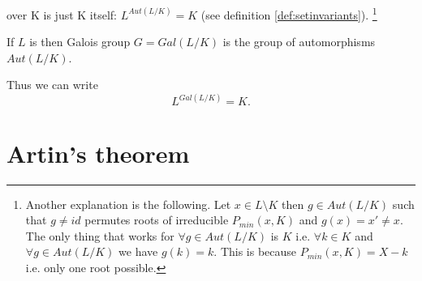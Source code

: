 \begin{remark}
\begin{enumerate}
    over K is just K itself: 
    $L^{Aut\left(L/K\right)} = K$
    (see definition \ref{def:setinvariants}).
    \footnote{
      Another explanation is the following. Let $x \in L \setminus K$
      then $g \in Aut\left(L/K\right)$ such that $g \ne id$ permutes
      roots of irreducible $P_{min}\left(x, K\right)$ and $g(x) = x'
      \ne x$. The only thing that works for 
      $\forall g \in Aut\left(L/K\right)$ is $K$ i.e.
      $\forall k \in K$ and $\forall g \in Aut\left(L/K\right)$ we
      have $g(k) = k$. This is because $P_{min}\left(x, K\right) = X
      - k$ i.e. only one root possible.
    }
  \end{enumerate}
\end{remark}

\begin{definition}
  If $L$ is  then Galois group $G =
  Gal\left(L/K\right)$ is the group of automorphisms $Aut\left(L/K\right)$. 
  \label{def:galoisgroup}
\end{definition}

Thus we can write
\begin{equation}
  L^{Gal\left(L/K\right)} = K.
  \label{eq:lec5_2}
\end{equation}

\section{Artin's theorem}

